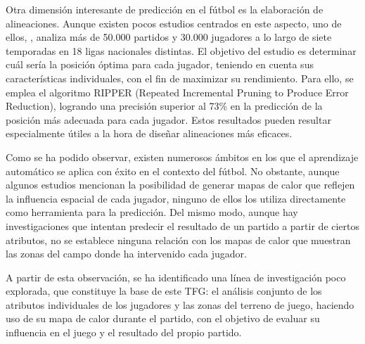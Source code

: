Otra dimensión interesante de predicción en el fútbol es la elaboración de alineaciones. Aunque existen pocos estudios centrados en este aspecto, uno de ellos, \cite{starting-up}, analiza más de 50.000 partidos y 30.000 jugadores a lo largo de siete temporadas en 18 ligas nacionales distintas. El objetivo del estudio es determinar cuál sería la posición óptima para cada jugador, teniendo en cuenta sus características individuales, con el fin de maximizar su rendimiento. Para ello, se emplea el algoritmo RIPPER (Repeated Incremental Pruning to Produce Error Reduction), logrando una precisión superior al 73\% en la predicción de la posición más adecuada para cada jugador. Estos resultados pueden resultar especialmente útiles a la hora de diseñar alineaciones más eficaces.

Como se ha podido observar, existen numerosos ámbitos en los que el aprendizaje automático se aplica con éxito en el contexto del fútbol. No obstante, aunque algunos estudios mencionan la posibilidad de generar mapas de calor que reflejen la influencia espacial de cada jugador, ninguno de ellos los utiliza directamente como herramienta para la predicción. Del mismo modo, aunque hay investigaciones que intentan predecir el resultado de un partido a partir de ciertos atributos, no se establece ninguna relación con los mapas de calor que muestran las zonas del campo donde ha intervenido cada jugador.

A partir de esta observación, se ha identificado una línea de investigación poco explorada, que constituye la base de este TFG: el análisis conjunto de los atributos individuales de los jugadores y las zonas del terreno de juego, haciendo uso de su mapa de calor durante el partido, con el objetivo de evaluar su influencia en el juego y el resultado del propio partido.